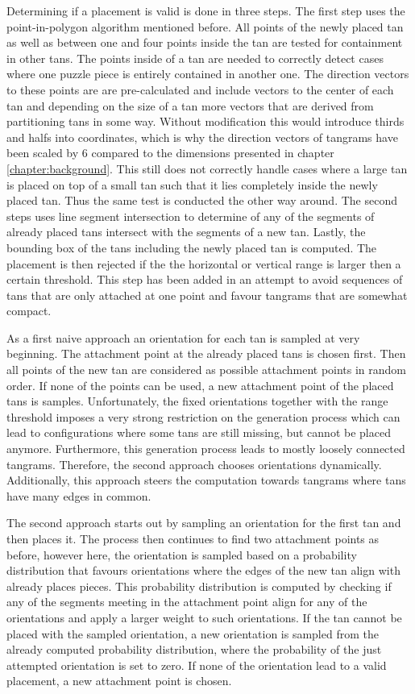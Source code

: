 Determining if a placement is valid is done in three steps. The first step uses the point-in-polygon algorithm mentioned before. All points of the newly placed tan as well as between one and four points inside the tan are tested for containment in other tans. The points inside of a tan are needed to correctly detect cases where one puzzle piece is entirely contained in another one. The direction vectors to these points are are pre-calculated and include vectors to the center of each tan and depending on the size of a tan more vectors that are derived from partitioning tans in some way. Without modification this would introduce thirds and halfs into coordinates, which is why the direction vectors of tangrams have been scaled by 6 compared to the dimensions presented in chapter \ref{chapter:background}. This still does not correctly handle cases where a large tan is placed on top of a small tan such that it lies completely inside the newly placed tan. Thus the same test is conducted the other way around. The second steps uses line segment intersection to determine of any of the segments of already placed tans intersect with the segments of a new tan.
Lastly, the bounding box of the tans including the newly placed tan is computed. The placement is then rejected if the the horizontal or vertical range is larger then a certain threshold. This step has been added in an attempt to avoid  sequences of tans that are only attached at one point and favour tangrams that are somewhat compact.

As a first naive approach an orientation for each tan is sampled at very beginning. The attachment point at the already placed tans is chosen first. Then all points of the new tan are considered as possible attachment points in random order. If none of the points can be used, a new attachment point of the placed tans is samples. Unfortunately, the fixed orientations together with the range threshold imposes a very strong restriction on the generation process which can lead to configurations where some tans are still missing, but cannot be placed anymore. Furthermore, this generation process leads to mostly loosely connected tangrams. Therefore, the second approach chooses orientations dynamically. Additionally, this approach steers the computation towards tangrams where tans have many edges in common.

The second approach starts out by sampling an orientation for the first tan and then places it. The process then continues to find two attachment points as before, however here, the orientation is sampled based on a probability distribution that favours orientations where the edges of the new tan align with already places pieces. This probability distribution is computed by checking if any of the segments meeting in the attachment point align for any of the orientations and apply a larger weight to such orientations. If the tan cannot be placed with the sampled orientation, a new orientation is sampled from the already computed probability distribution, where the probability of the just attempted orientation is set to zero. If none of the orientation lead to a valid placement, a new attachment point is chosen.

